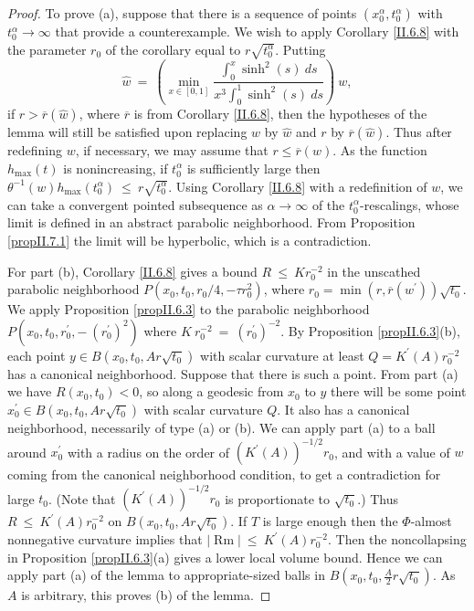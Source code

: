 \documentclass[12pt]{amsart}
\newcommand{\al}{\alpha}
\newcommand{\Rm}{\operatorname{Rm}}
\numberwithin{equation}{section}
\theoremstyle{plain}
\theoremstyle{definition}
\theoremstyle{remark}
\begin{document}
\begin{proof}
To prove (a), suppose that there is a sequence of points
$(x_0^\al, t_0^\al)$ with $t_0^\al \rightarrow \infty$
that provide a counterexample.  We wish to apply
Corollary \ref{II.6.8} with the parameter $r_0$ of the
corollary equal to $r \sqrt{t_0^\al}$.
Putting 
\begin{equation}
\widehat{w} \: = \: \left( \min_{x \in [0,1]} \frac{\int_0^x \sinh^2(s) \: 
ds}{x^3 \int_0^1 \sinh^2(s) \: ds} \right) \: w,
\end{equation}
if $r > \overline{r}(\widehat{w})$,
where $\overline{r}$ is from Corollary \ref{II.6.8},
then the hypotheses of the lemma will still be satisfied upon replacing
$w$ by $\widehat{w}$ and  
$r$ by $\overline{r}(\widehat{w})$.
Thus 
after redefining   $w$, if necessary,
we may assume that $r \le \overline{r}(w)$.
As the function
$h_{\max}(t)$ 
is nonincreasing, if $t_0^\al$ is sufficiently
large then 
$\theta^{-1}(w)h_{\max}(t_0^\al) \: \le \: r \sqrt{t_0^\al}$.
Using Corollary \ref{II.6.8} with a redefinition of $w$,
we can take a convergent pointed subsequence
as $\al \rightarrow \infty$ of the $t_0^\al$-rescalings,
whose limit is defined in an abstract parabolic neighborhood.
From Proposition \ref{propII.7.1} 
the limit will be hyperbolic, which is a contradiction.

For part (b), Corollary \ref{II.6.8} gives a bound $R \: \le \: K r_0^{-2}$ in
the unscathed parabolic neighborhood $P(x_0, t_0, r_0/4, -\tau r_0^2)$,
where 
$r_0 = \min(r, \overline{r}(w^\prime)) \sqrt{t_0}$.
We apply Proposition \ref{propII.6.3} to the parabolic
neighborhood $P(x_0, t_0, r_0^\prime, - \: (r_0^\prime)^2)$ where
$K \: r_0^{-2} \: = \: (r_0^\prime)^{-2}$. By Proposition \ref{propII.6.3}(b), each
point $ y\in B(x_0, t_0, Ar\sqrt{t_0})$ with scalar curvature at
least $Q = K^\prime(A) r_0^{-2}$ has a canonical neighborhood. 
Suppose that there is such a point.  From part (a) we have $R(x_0, t_0) < 0$, so
along a geodesic from $x_0$ to $y$ there will be some point
$x^\prime_0 \in B(x_0, t_0, Ar\sqrt{t_0})$ 
with scalar curvature $Q$. It also has a canonical neighborhood,
necessarily of type (a) or (b).
We can apply part (a) to a ball around $x^\prime_0$ with a radius
on the order of $(K^\prime(A))^{-1/2} r_0$, and with a value 
of $w$ coming from the canonical neighborhood condition, 
to get a contradiction 
for large $t_0$.
(Note that $(K^\prime(A))^{-1/2} r_0$ is proportionate to
$\sqrt{t_0}$.)
Thus $R \: \le \: K^\prime(A) r_0^{-2}$
on $B(x_0, t_0, Ar\sqrt{t_0})$. If $T$ is large enough then the
$\Phi$-almost nonnegative curvature implies that $|\Rm| \: \le \:
K^\prime(A) r_0^{-2}$. Then the noncollapsing in  
Proposition \ref{propII.6.3}(a) gives a lower local
volume bound. Hence we can apply part (a) of the lemma 
to appropriate-sized balls in
$B(x_0, t_0, \frac{A}{2} r\sqrt{t_0})$. As $A$ is arbitrary, this
proves (b) of the lemma.


\end{proof}
\end{document}
